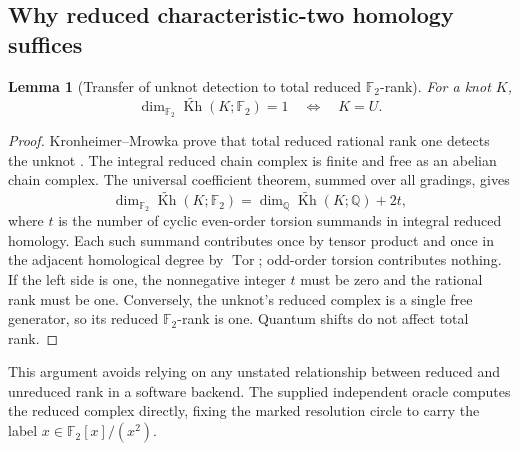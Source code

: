 \documentclass[11pt,letterpaper]{article}
\newtheorem{lemma}[theorem]{Lemma}
\theoremstyle{definition}
\newcommand{\F}{\mathbb F_2}
\newcommand{\Kh}{\widetilde{\operatorname{Kh}}}
\begin{document}
\subsection{Why reduced characteristic-two homology suffices}
\begin{lemma}[Transfer of unknot detection to total reduced $\F$-rank]
\label{lem:f2}
For a knot $K$,
\[
 \dim_{\F}\Kh(K;\F)=1\quad\Longleftrightarrow\quad K=U.
\]
\end{lemma}
\begin{proof}
Kronheimer--Mrowka prove that total reduced rational rank one detects the unknot \cite{km}. The integral reduced chain complex is finite and free as an abelian chain complex. The universal coefficient theorem, summed over all gradings, gives
\[
 \dim_{\F}\Kh(K;\F)
 =\dim_{\mathbb Q}\Kh(K;\mathbb Q)+2t,
\]
where $t$ is the number of cyclic even-order torsion summands in integral reduced homology. Each such summand contributes once by tensor product and once in the adjacent homological degree by $\operatorname{Tor}$; odd-order torsion contributes nothing. If the left side is one, the nonnegative integer $t$ must be zero and the rational rank must be one. Conversely, the unknot's reduced complex is a single free generator, so its reduced $\F$-rank is one. Quantum shifts do not affect total rank.
\end{proof}

This argument avoids relying on any unstated relationship between reduced and unreduced rank in a software backend. The supplied independent oracle computes the reduced complex directly, fixing the marked resolution circle to carry the label $x\in\F[x]/(x^2)$.
\end{document}
